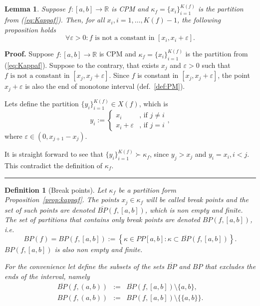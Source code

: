 \documentclass[12pt, a4paper]{article}
\newtheorem{lemma}[theorem]{Lemma}
\newtheorem{definition}[theorem]{Definition}
\newenvironment{proof}[1][Proof]{\noindent \textbf{#1.} }{\  \rule{0.5em}{0.5em}}
\numberwithin{equation}{section}
\begin{document}
\begin{lemma}\label{lem:noncons}
  Suppose $f:[a,b] \rightarrow \mathbb{R}$ is CPM and $\kappa_f=\{x_i\}_{i=1}^{K(f)}$ 
  is the partition from (\ref{eq:Kappaf}).
  Then, for all $x_i,i=1,\dots,K(f)-1$, the following proposition holds
  \begin{equation}
    \forall \varepsilon>0: f \text{ is not a constant in } [x_i,x_i + \varepsilon].
  \end{equation}
\end{lemma}
\begin{proof} 
  Suppose $f:[a,b] \rightarrow \mathbb{R}$ is CPM and $\kappa_f=\{x_i\}_{i=1}^{K(f)}$ 
  is the partition from (\ref{eq:Kappaf}).
  Suppose to the contrary, that exists $x_j$ and $\varepsilon > 0$ such that
  $f \text{ is not a constant in } [x_j,x_j + \varepsilon]$.
  Since $f$ is constant in $[x_j,x_j + \varepsilon]$,
  the point $x_j + \varepsilon$ is also the end of monotone interval (def.~\ref{def:PM}).
  
  Lets define the partition $\{y_i\}_{i=1}^{K(f)} \in X(f)$, which is
  \begin{equation}
    y_i :=
    \begin{cases}
      x_i & \text{, if } j \neq i \\
      x_i+\varepsilon  & \text{, if } j = i
    \end{cases},
  \end{equation}
  where $\varepsilon \in (0, x_{j+1}-x_j)$.
  
  It is straight forward to see that $\{y_i\}_{i=1}^{K(f)} \succ \kappa_f$, since
  $y_j>x_j$ and $y_i=x_i,i<j$. 
  This contradict the definition of $\kappa_f$. 
\end{proof}   
  
  
\begin{definition}[Break points]\label{def:BreakPoint}
  Let $\kappa_f$ be a partition form Proposition~\ref{prop:kappaf}.  
  The points $x_j \in \kappa_f$ will be called \emph{break points} 
  and the set of such points are denoted $\overline{BP}(f,[a,b])$, which is non empty and finite.
  The set of partitions that contains only break points are denoted $BP(f,[a,b])$, i.e.
  \begin{equation}
    BP(f) = BP(f,[a,b]) := \left\{\kappa \in PP[a,b]: \kappa \subset \overline{BP}(f,[a,b]) \right\}. 
  \end{equation}
  $BP(f,[a,b])$ is also non empty and finite.
  
  For the convenience let define the subsets of the sets $\overline{BP}$ and $BP$ 
  that excludes the ends of the interval, namely
  \begin{eqnarray}
    \overline{BP}(f,(a,b)) &:=& \overline{BP}(f,[a,b])\setminus \{a,b\}, \\
    BP(f,(a,b)) &:=& BP(f,[a,b])\setminus \{\{a,b\}\}.  \label{eq:BP(f,(a,b))}
  \end{eqnarray}
\end{definition}  
  
\end{document}
